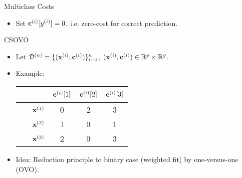 \documentclass[11pt,compress,t,notes=noshow, xcolor=table]{beamer}
\begin{document}
\begin{vbframe}{Multiclass Costs}
\begin{itemize}
        \item Set $\mathbf{c}^{(i)}[y^{(i)}] = 0$, i.e. zero-cost for correct prediction.
        \vspace{5pt}
        
            
    \end{itemize}
\end{vbframe}

\begin{vbframe}{CSOVO \href{https://proceedings.mlr.press/v39/lin14.pdf}{}}
    

    \begin{itemize}
        \item Let $\mathcal{D}^{(n)} = \{(\mathbf{x}^{(i)}, \mathbf{c}^{(i)})\}_{i=1}^n$, $(\mathbf{x}^{(i)}, \mathbf{c}^{(i)}) \in \mathbb{R}^p \times \mathbb{R}^g$. 
        \vspace{5pt}    
        \item Example:
        \vspace{5pt}

                        \begin{center}
                            \begin{tabular}{cc|ccc}\
        			& & $\mathbf{c}^{(i)}[1]$ & $\mathbf{c}^{(i)}[2]$ & $\mathbf{c}^{(i)}[3]$  \\
        			\hline & $\mathbf{x}^{(1)}$ & 0 & 2 & 3\\
        			& $\mathbf{x}^{(2)}$ & 1 & 0 & 1\\
                 	& $\mathbf{x}^{(3)}$ & 2 & 0 & 3\\
                \end{tabular}
        \end{center}
        
        \vspace{5pt}
        \vspace{5pt}
        
        \item Idea: Reduction principle to binary case (weighted fit) by one-versus-one (OVO). 
        

\end{itemize}
\end{vbframe}
\end{document}
